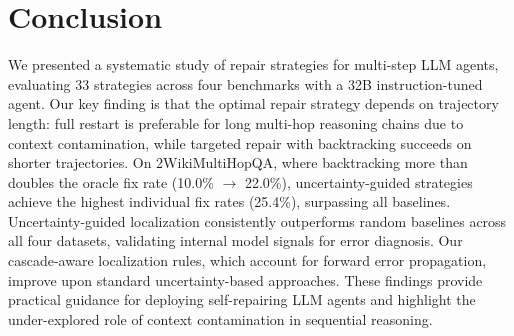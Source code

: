 \documentclass[letterpaper]{article}
\begin{document}
\section{Conclusion}

We presented a systematic study of repair strategies for multi-step LLM agents, evaluating 33 strategies across four benchmarks with a 32B instruction-tuned agent. Our key finding is that the optimal repair strategy depends on trajectory length: full restart is preferable for long multi-hop reasoning chains due to context contamination, while targeted repair with backtracking succeeds on shorter trajectories. On 2WikiMultiHopQA, where backtracking more than doubles the oracle fix rate (10.0\% $\to$ 22.0\%), uncertainty-guided strategies achieve the highest individual fix rates (25.4\%), surpassing all baselines. Uncertainty-guided localization consistently outperforms random baselines across all four datasets, validating internal model signals for error diagnosis. Our cascade-aware localization rules, which account for forward error propagation, improve upon standard uncertainty-based approaches. These findings provide practical guidance for deploying self-repairing LLM agents and highlight the under-explored role of context contamination in sequential reasoning.


\end{document}
